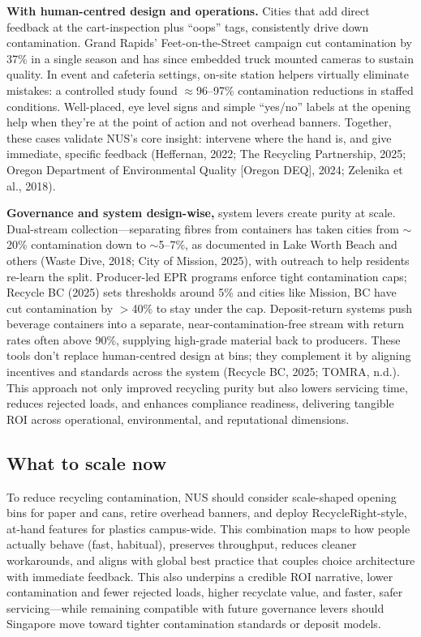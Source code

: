 \documentclass[12pt]{article}
\begin{document}
\textbf{With human-centred design and operations.} Cities that add direct feedback at the cart-inspection plus ``oops'' tags, consistently drive down contamination. Grand Rapids' Feet-on-the-Street campaign cut contamination by 37\% in a single season and has since embedded truck mounted cameras to sustain quality. In event and cafeteria settings, on-site station helpers virtually eliminate mistakes: a controlled study found $\approx$96--97\% contamination reductions in staffed conditions. Well-placed, eye level signs and simple ``yes/no'' labels at the opening help when they're at the point of action and not overhead banners. Together, these cases validate NUS's core insight: intervene where the hand is, and give immediate, specific feedback (Heffernan, 2022; The Recycling Partnership, 2025; Oregon Department of Environmental Quality [Oregon DEQ], 2024; Zelenika et al., 2018).

\textbf{Governance and system design-wise,} system levers create purity at scale. Dual-stream collection---separating fibres from containers has taken cities from $\sim$20\% contamination down to $\sim$5--7\%, as documented in Lake Worth Beach and others (Waste Dive, 2018; City of Mission, 2025), with outreach to help residents re-learn the split. Producer-led EPR programs enforce tight contamination caps; Recycle BC (2025) sets thresholds around 5\% and cities like Mission, BC have cut contamination by $>$40\% to stay under the cap. Deposit-return systems push beverage containers into a separate, near-contamination-free stream with return rates often above 90\%, supplying high-grade material back to producers. These tools don't replace human-centred design at bins; they complement it by aligning incentives and standards across the system (Recycle BC, 2025; TOMRA, n.d.). This approach not only improved recycling purity but also lowers servicing time, reduces rejected loads, and enhances compliance readiness, delivering tangible ROI across operational, environmental, and reputational dimensions.

\subsection{What to scale now}

To reduce recycling contamination, NUS should consider scale-shaped opening bins for paper and cans, retire overhead banners, and deploy RecycleRight-style, at-hand features for plastics campus-wide. This combination maps to how people actually behave (fast, habitual), preserves throughput, reduces cleaner workarounds, and aligns with global best practice that couples choice architecture with immediate feedback. This also underpins a credible ROI narrative, lower contamination and fewer rejected loads, higher recyclate value, and faster, safer servicing---while remaining compatible with future governance levers should Singapore move toward tighter contamination standards or deposit models.
\end{document}
